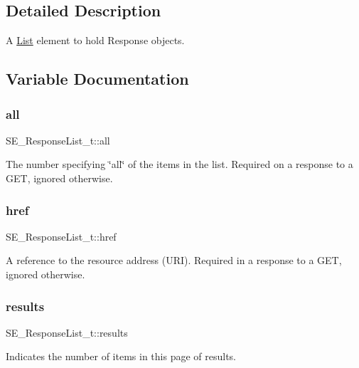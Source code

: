 \subsection{Detailed Description}
A \hyperlink{structList}{List} element to hold Response objects. 

\subsection{Variable Documentation}
\mbox{\label{group__ResponseList_ga7055f5d4b853f35d0ea603f85154c53c}} 
\subsubsection{\texorpdfstring{all}{all}}
{\footnotesize\ttfamily S\+E\+\_\+\+Response\+List\+\_\+t\+::all}

The number specifying \char`\"{}all\char`\"{} of the items in the list. Required on a response to a G\+ET, ignored otherwise. \mbox{\label{group__ResponseList_ga32523c09761d4f0cd43b3dae1bb3c9d9}} 
\subsubsection{\texorpdfstring{href}{href}}
{\footnotesize\ttfamily S\+E\+\_\+\+Response\+List\+\_\+t\+::href}

A reference to the resource address (U\+RI). Required in a response to a G\+ET, ignored otherwise. \mbox{\label{group__ResponseList_ga45065ab96f53805ad13f19fa4593f52f}} 
\subsubsection{\texorpdfstring{results}{results}}
{\footnotesize\ttfamily S\+E\+\_\+\+Response\+List\+\_\+t\+::results}

Indicates the number of items in this page of results. 